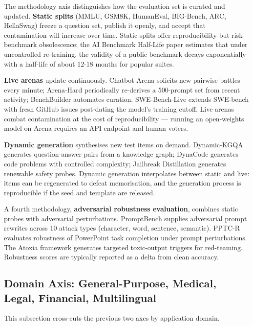 \documentclass{article}
\begin{document}
The methodology axis distinguishes how the evaluation set is curated and updated. \textbf{Static splits} (MMLU, GSM8K, HumanEval, BIG-Bench, ARC, HellaSwag) freeze a question set, publish it openly, and accept that contamination will increase over time. Static splits offer reproducibility but risk benchmark obsolescence; the AI Benchmark Half-Life paper \cite{white20242024} estimates that under uncontrolled re-training, the validity of a public benchmark decays exponentially with a half-life of about 12-18 months for popular suites.

\textbf{Live arenas} update continuously. Chatbot Arena \cite{chiang20242024} solicits new pairwise battles every minute; Arena-Hard \cite{li20242024} periodically re-derives a 500-prompt set from recent activity; BenchBuilder automates curation. SWE-Bench-Live extends SWE-bench with fresh GitHub issues post-dating the model's training cutoff. Live arenas combat contamination at the cost of reproducibility --- running an open-weights model on Arena requires an API endpoint and human voters.

\textbf{Dynamic generation} synthesises new test items on demand. Dynamic-KGQA \cite{dammu2025dynamickgqaascalab} generates question-answer pairs from a knowledge graph; DynaCode \cite{hu20252025} generates code problems with controlled complexity; Jailbreak Distillation \cite{zhang20252025} generates renewable safety probes. Dynamic generation interpolates between static and live: items can be regenerated to defeat memorisation, and the generation process is reproducible if the seed and template are released.

A fourth methodology, \textbf{adversarial robustness evaluation}, combines static probes with adversarial perturbations. PromptBench supplies adversarial prompt rewrites across 10 attack types (character, word, sentence, semantic). PPTC-R \cite{zhang20242024} evaluates robustness of PowerPoint task completion under prompt perturbations. The Atoxia framework \cite{du20242024} generates targeted toxic-output triggers for red-teaming. Robustness scores are typically reported as a delta from clean accuracy.

\subsection{Domain Axis: General-Purpose, Medical, Legal, Financial, Multilingual}\label{domain-axis-general-purpose-medical-legal-financial-multilingual}

This subsection cross-cuts the previous two axes by application domain.
\end{document}

